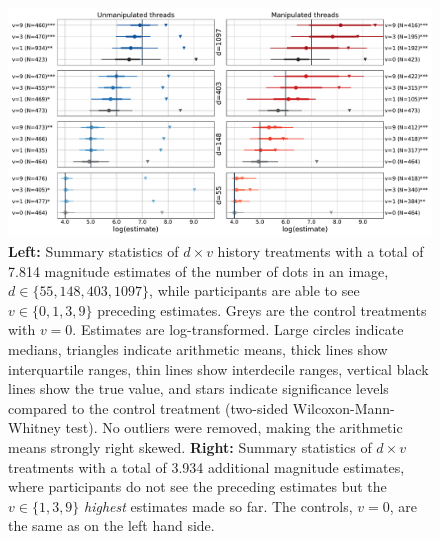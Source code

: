 \documentclass[9pt,a4paper,twocolumn,lineno]{article}
\begin{document}
\begin{figure}
\centering
\includegraphics[width=1\linewidth]{summary_stats_plot.pdf}
\caption{\textbf{Left:} Summary statistics of $d \times v$ history treatments with a total of 7.814 magnitude estimates of the number of dots in an image, $d \in \{55,148,403,1097\}$, while participants are able to see $v \in \{0,1,3,9\}$ preceding estimates. Greys are the control treatments with $v=0$. Estimates are log-transformed. Large circles indicate medians, triangles indicate arithmetic means, thick lines show interquartile ranges, thin lines show interdecile ranges, vertical black lines show the true value, and stars indicate significance levels compared to the control treatment (two-sided Wilcoxon-Mann-Whitney test). No outliers were removed, making the arithmetic means strongly right skewed. \textbf{Right:} Summary statistics of $d \times v$ treatments with a total of 3.934 additional magnitude estimates, where participants do not see the preceding estimates but the $v \in \{1,3,9\}$ \textit{highest} estimates made so far. The controls, $v=0$, are the same as on the left hand side.}\label{fig:sum_stats}
\end{figure}
\end{document}
